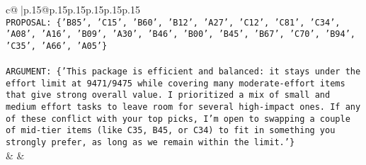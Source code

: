 \documentclass{article}
\begin{document}
{\begin{supertabular}{c@{$\;$}|p{.15\linewidth}@{}p{.15\linewidth}p{.15\linewidth}p{.15\linewidth}p{.15\linewidth}p{.15\linewidth}}
{{{\\ 
\texttt{PROPOSAL: \{'B85', 'C15', 'B60', 'B12', 'A27', 'C12', 'C81', 'C34', 'A08', 'A16', 'B09', 'A30', 'B46', 'B00', 'B45', 'B67', 'C70', 'B94', 'C35', 'A66', 'A05'\}} \\
\\ 
\texttt{ARGUMENT: \{'This package is efficient and balanced: it stays under the effort limit at 9471/9475 while covering many moderate{-}effort items that give strong overall value. I prioritized a mix of small and medium effort tasks to leave room for several high{-}impact ones. If any of these conflict with your top picks, I’m open to swapping a couple of mid{-}tier items (like C35, B45, or C34) to fit in something you strongly prefer, as long as we remain within the limit.'\}} \\
            }
        }
    }
    & & \\ \\


\end{supertabular}}
\end{document}
